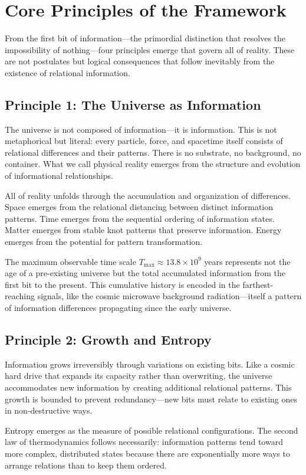 \documentclass{article}
\begin{document}
\section{Core Principles of the Framework}
From the first bit of information—the primordial distinction that resolves the impossibility of nothing—four principles emerge that govern all of reality. These are not postulates but logical consequences that follow inevitably from the existence of relational information.

\subsection{Principle 1: The Universe as Information}
The universe is not composed of information—it is information. This is not metaphorical but literal: every particle, force, and spacetime itself consists of relational differences and their patterns. There is no substrate, no background, no container. What we call physical reality emerges from the structure and evolution of informational relationships.

All of reality unfolds through the accumulation and organization of differences. Space emerges from the relational distancing between distinct information patterns. Time emerges from the sequential ordering of information states. Matter emerges from stable knot patterns that preserve information. Energy emerges from the potential for pattern transformation.

The maximum observable time scale $T_{\max} \approx 13.8 \times 10^9$ years represents not the age of a pre-existing universe but the total accumulated information from the first bit to the present. This cumulative history is encoded in the farthest-reaching signals, like the cosmic microwave background radiation—itself a pattern of information differences propagating since the early universe.

\subsection{Principle 2: Growth and Entropy}
Information grows irreversibly through variations on existing bits. Like a cosmic hard drive that expands its capacity rather than overwriting, the universe accommodates new information by creating additional relational patterns. This growth is bounded to prevent redundancy—new bits must relate to existing ones in non-destructive ways.

Entropy emerges as the measure of possible relational configurations. The second law of thermodynamics follows necessarily: information patterns tend toward more complex, distributed states because there are exponentially more ways to arrange relations than to keep them ordered.
\end{document}
